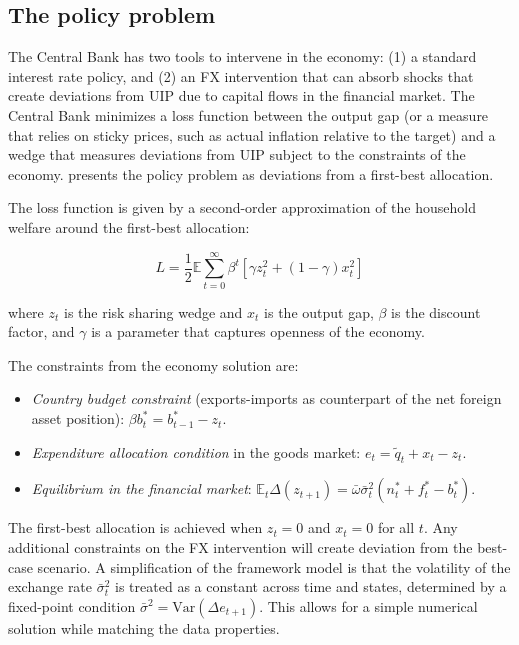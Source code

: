 \documentclass[12pt,a4paper]{article}
\begin{document}
\subsection{The policy problem}

The Central Bank has two tools to intervene in the economy: (1) a standard interest rate policy, and (2) an FX intervention that can absorb shocks that create deviations from UIP due to capital flows in the financial market. The Central Bank minimizes a loss function between the output gap (or a measure that relies on sticky prices, such as actual inflation relative to the target) and a wedge that measures deviations from UIP subject to the constraints of the economy. \cite{itskhokimukhin2025} presents the policy problem as deviations from a first-best allocation.

The loss function is given by a second-order approximation of the household welfare around the first-best allocation:

\begin{equation}
    L = \frac{1}{2}\mathbb{E}\sum_{t=0}^{\infty} \beta^t \left[ \gamma z_t^2 + (1-\gamma) x_t^2 \right]
\end{equation}

where $z_t$ is the risk sharing wedge and $x_t$ is the output gap, $\beta$ is the discount factor, and $\gamma$ is a parameter that captures openness of the economy.

The constraints from the economy solution are:

\begin{itemize}

    \item \textit{Country budget constraint} (exports-imports as counterpart of the net foreign asset position): 
    $\beta b_t^* = b_{t-1}^* - z_t$.
    
    \item \textit{Expenditure allocation condition} in the goods market: 
    $e_t = \tilde{q}_t + x_t - z_t$.
    
    \item \textit{Equilibrium in the financial market}:
    $\mathbb{E}_t \Delta (z_{t+1}) = \bar{\omega} \bar{\sigma}^2_t (n_t^* + f_t^* - b_t^*)$.

\end{itemize}

The first-best allocation is achieved when $z_t = 0$ and $x_t = 0$ for all $t$. Any additional constraints on the FX intervention will create deviation from the best-case scenario. A simplification of the framework model is that the volatility of the exchange rate $\bar{\sigma}^2_t$ is treated as a constant across time and states, determined by a fixed-point condition $\bar{\sigma}^2 = \text{Var}(\Delta e_{t+1})$. This allows for a simple numerical solution while matching the data properties.
\end{document}
